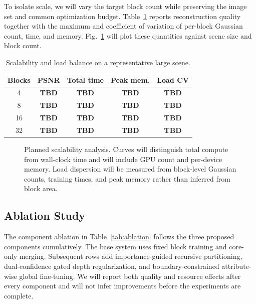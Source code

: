\documentclass[conference]{IEEEtran}
\newcommand{\TBD}{\textbf{TBD}}
\begin{document}
To isolate scale, we will vary the target block count while preserving the image set and common optimization budget. Table~\ref{tab:scaling} reports reconstruction quality together with the maximum and coefficient of variation of per-block Gaussian count, time, and memory. Fig.~\ref{fig:scaling} will plot these quantities against scene size and block count.

\begin{table}[t]
\caption{Scalability and load balance on a representative large scene.}
\label{tab:scaling}
\centering
\setlength{\tabcolsep}{2.7pt}
\begin{tabular}{ccccc}
\toprule
Blocks & PSNR & Total time & Peak mem. & Load CV \\
\midrule
4 & \TBD & \TBD & \TBD & \TBD \\
8 & \TBD & \TBD & \TBD & \TBD \\
16 & \TBD & \TBD & \TBD & \TBD \\
32 & \TBD & \TBD & \TBD & \TBD \\
\bottomrule
\end{tabular}
\end{table}

\begin{figure}[t]
    \centering
    \caption{Planned scalability analysis. Curves will distinguish total compute from wall-clock time and will include GPU count and per-device memory. Load dispersion will be measured from block-level Gaussian counts, training times, and peak memory rather than inferred from block area.}
    \label{fig:scaling}
\end{figure}

\subsection{Ablation Study}

The component ablation in Table~\ref{tab:ablation} follows the three proposed components cumulatively. The base system uses fixed block training and core-only merging. Subsequent rows add importance-guided recursive partitioning, dual-confidence gated depth regularization, and boundary-constrained attribute-wise global fine-tuning. We will report both quality and resource effects after every component and will not infer improvements before the experiments are complete.
\end{document}
